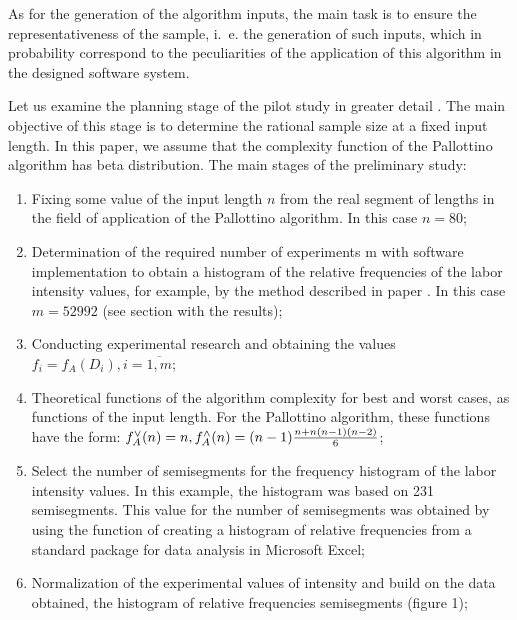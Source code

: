 \documentclass[a4paper]{article}
\begin{document}
As for the generation of the algorithm inputs, the main task is to ensure the representativeness of the sample, i.~e. the generation of such inputs, which in probability correspond to the peculiarities of the application of this algorithm in the designed software system.

Let us examine the planning stage of the pilot study in greater detail \cite{petrushyn_ulyanov_planning}. The main objective of this stage is to determine the rational sample size at a fixed input length. In this paper, we assume that the complexity function of the Pallottino algorithm has beta distribution. The main stages of the preliminary study:

\begin{enumerate}
	\item Fixing some value of the input length $n$ from the real segment of lengths in the field of application of the Pallottino algorithm. In this case $n = 80$;
	
	\item Determination of the required number of experiments m with software implementation to obtain a histogram of the relative frequencies of the labor intensity values, for example, by the method described in paper \cite{petrushyn_ulyanov_planning}. In this case $m = 52992$ (see section with the results);
	
	\item Conducting experimental research and obtaining the values \\$f_i = f_A(D_i), i = \overline{1, m}$;
	
	\item Theoretical functions of the algorithm complexity for best and worst cases, as functions of the input length. For the Pallottino algorithm, these functions have the form: $f_A^\vee(n) = n, f_A^\wedge(n) = (n - 1){n + n(n - 1)(n - 2) \over{6}}$;
	
	\item Select the number of semisegments for the frequency histogram of the labor intensity values. In this example, the histogram was based on 231 semisegments. This value for the number of semisegments was obtained by using the function of creating a histogram of relative frequencies from a standard package for data analysis in Microsoft Excel;
	
	\item Normalization of the experimental values of intensity and build on the data obtained, the histogram of relative frequencies semisegments (figure 1);
	

\end{enumerate}
\end{document}

